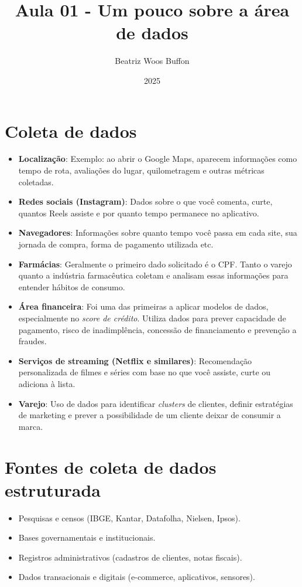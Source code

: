 \documentclass{article}
\title{Aula 01 - Um pouco sobre a área de dados}
\author{Beatriz Woos Buffon}
\date{2025}
\begin{document}
\maketitle

\section*{Coleta de dados}

\begin{itemize}
    \item \textbf{Localização}: Exemplo: ao abrir o Google Maps, aparecem informações como tempo de rota, avaliações do lugar, quilometragem e outras métricas coletadas.
    \item \textbf{Redes sociais (Instagram)}: Dados sobre o que você comenta, curte, quantos Reels assiste e por quanto tempo permanece no aplicativo.
    \item \textbf{Navegadores}: Informações sobre quanto tempo você passa em cada site, sua jornada de compra, forma de pagamento utilizada etc.
    \item \textbf{Farmácias}: Geralmente o primeiro dado solicitado é o CPF. Tanto o varejo quanto a indústria farmacêutica coletam e analisam essas informações para entender hábitos de consumo.
    \item \textbf{Área financeira}: Foi uma das primeiras a aplicar modelos de dados, especialmente no \textit{score de crédito}. Utiliza dados para prever capacidade de pagamento, risco de inadimplência, concessão de financiamento e prevenção a fraudes.
    \item \textbf{Serviços de streaming (Netflix e similares)}: Recomendação personalizada de filmes e séries com base no que você assiste, curte ou adiciona à lista.
    \item \textbf{Varejo}: Uso de dados para identificar \textit{clusters} de clientes, definir estratégias de marketing e prever a possibilidade de um cliente deixar de consumir a marca.
\end{itemize}

\section*{Fontes de coleta de dados estruturada}
\begin{itemize}
    \item Pesquisas e censos (IBGE, Kantar, Datafolha, Nielsen, Ipsos).
    \item Bases governamentais e institucionais.
    \item Registros administrativos (cadastros de clientes, notas fiscais).
    \item Dados transacionais e digitais (e-commerce, aplicativos, sensores).
\end{itemize}
\end{document}
